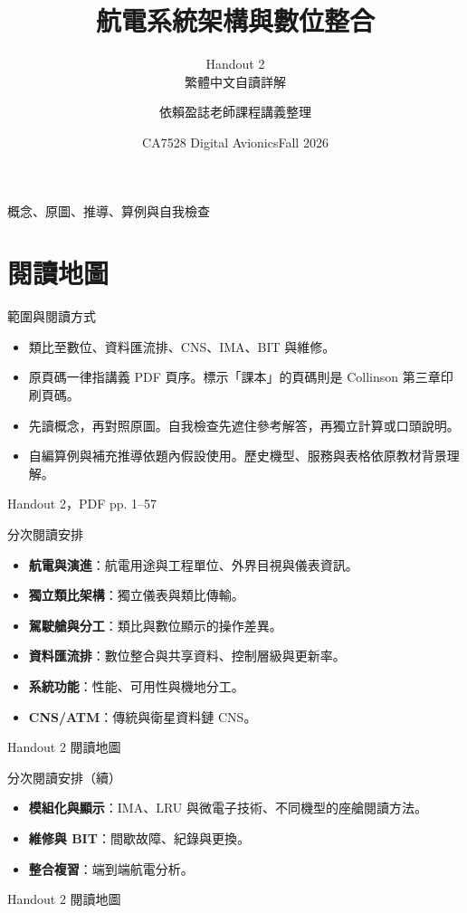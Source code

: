 \documentclass[aspectratio=169,11pt]{beamer}
\title{航電系統架構與數位整合}
\subtitle{Handout 2\\繁體中文自讀詳解}
\author{依賴盈誌老師課程講義整理}
\date{CA7528 Digital Avionics\quad Fall 2026}
\newcommand{\src}[1]{\par\vfill{\scriptsize\color{teal}#1}}
\newcommand{\slide}[3]{\begin{frame}[t]{#1}#3\src{#2}\end{frame}}
\newcommand{\bi}{\begin{itemize}\setlength{\itemsep}{5pt}}
\newcommand{\ei}{\end{itemize}}
\begin{document}
\begin{frame}\titlepage\centering\small 概念、原圖、推導、算例與自我檢查\end{frame}
\section{閱讀地圖}
\slide{範圍與閱讀方式}{Handout 2，PDF pp. 1--57}{
\bi
\item 類比至數位、資料匯流排、CNS、IMA、BIT 與維修。
\item 原頁碼一律指講義 PDF 頁序。標示「課本」的頁碼則是 Collinson 第三章印刷頁碼。
\item 先讀概念，再對照原圖。自我檢查先遮住參考解答，再獨立計算或口頭說明。
\item 自編算例與補充推導依題內假設使用。歷史機型、服務與表格依原教材背景理解。
\ei
}
\slide{分次閱讀安排}{Handout 2 閱讀地圖}{
\small
\bi
\item \textbf{航電與演進}：航電用途與工程單位、外界目視與儀表資訊。
\item \textbf{獨立類比架構}：獨立儀表與類比傳輸。
\item \textbf{駕駛艙與分工}：類比與數位顯示的操作差異。
\item \textbf{資料匯流排}：數位整合與共享資料、控制層級與更新率。
\item \textbf{系統功能}：性能、可用性與機地分工。
\item \textbf{CNS/ATM}：傳統與衛星資料鏈 CNS。
\ei
}
\slide{分次閱讀安排（續）}{Handout 2 閱讀地圖}{
\small
\bi
\item \textbf{模組化與顯示}：IMA、LRU 與微電子技術、不同機型的座艙閱讀方法。
\item \textbf{維修與 BIT}：間歇故障、紀錄與更換。
\item \textbf{整合複習}：端到端航電分析。
\ei
}
\end{document}
